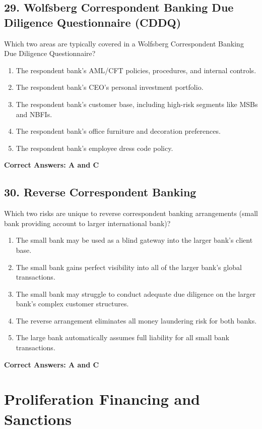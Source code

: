 \documentclass[11pt,a4paper]{article}
\begin{document}
	\subsection{29. Wolfsberg Correspondent Banking Due Diligence Questionnaire (CDDQ)}
	Which two areas are typically covered in a Wolfsberg Correspondent Banking Due Diligence Questionnaire?
	\begin{enumerate}[label=\Alph*.]
		\item The respondent bank's AML/CFT policies, procedures, and internal controls.
		\item The respondent bank's CEO's personal investment portfolio.
		\item The respondent bank's customer base, including high-risk segments like MSBs and NBFIs.
		\item The respondent bank's office furniture and decoration preferences.
		\item The respondent bank's employee dress code policy.
	\end{enumerate}
	\textbf{Correct Answers: A and C}
	
	\subsection{30. Reverse Correspondent Banking}
	Which two risks are unique to reverse correspondent banking arrangements (small bank providing account to larger international bank)?
	\begin{enumerate}[label=\Alph*.]
		\item The small bank may be used as a blind gateway into the larger bank's client base.
		\item The small bank gains perfect visibility into all of the larger bank's global transactions.
		\item The small bank may struggle to conduct adequate due diligence on the larger bank's complex customer structures.
		\item The reverse arrangement eliminates all money laundering risk for both banks.
		\item The large bank automatically assumes full liability for all small bank transactions.
	\end{enumerate}
	\textbf{Correct Answers: A and C}
	
	\section{Proliferation Financing and Sanctions}
	
\end{document}

